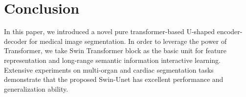 \documentclass[runningheads]{llncs}
\begin{document}
 \section{Conclusion}

In this paper, we introduced a novel pure transformer-based U-shaped encoder-decoder for medical image segmentation. In order to leverage the power of Transformer, we take Swin Transformer block as the basic unit for feature representation and long-range semantic information interactive learning. Extensive experiments on multi-organ and cardiac segmentation tasks demonstrate that the proposed Swin-Unet has excellent performance and generalization ability. 
%
 







\end{document}
